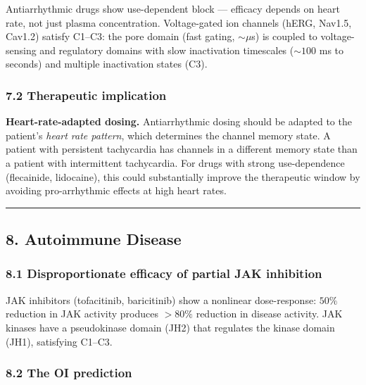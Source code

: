 \documentclass[
  11pt,
]{article}
\begin{document}
Antiarrhythmic drugs show use-dependent block --- efficacy depends on
heart rate, not just plasma concentration. Voltage-gated ion channels
(hERG, Nav1.5, Cav1.2) satisfy C1--C3: the pore domain (fast gating,
\(\sim \mu\)s) is coupled to voltage-sensing and regulatory domains with
slow inactivation timescales (\(\sim 100\) ms to seconds) and multiple
inactivation states (C3).

\hypertarget{therapeutic-implication-2}{%
\subsubsection{7.2 Therapeutic
implication}\label{therapeutic-implication-2}}

\textbf{Heart-rate-adapted dosing.} Antiarrhythmic dosing should be
adapted to the patient's \emph{heart rate pattern}, which determines the
channel memory state. A patient with persistent tachycardia has channels
in a different memory state than a patient with intermittent
tachycardia. For drugs with strong use-dependence (flecainide,
lidocaine), this could substantially improve the therapeutic window by
avoiding pro-arrhythmic effects at high heart rates.

\begin{center}\rule{0.5\linewidth}{0.5pt}\end{center}

\hypertarget{autoimmune-disease}{%
\subsection{8. Autoimmune Disease}\label{autoimmune-disease}}

\hypertarget{disproportionate-efficacy-of-partial-jak-inhibition}{%
\subsubsection{8.1 Disproportionate efficacy of partial JAK
inhibition}\label{disproportionate-efficacy-of-partial-jak-inhibition}}

JAK inhibitors (tofacitinib, baricitinib) show a nonlinear
dose-response: \(50\%\) reduction in JAK activity produces \(> 80\%\)
reduction in disease activity. JAK kinases have a pseudokinase domain
(JH2) that regulates the kinase domain (JH1), satisfying C1--C3.

\hypertarget{the-oi-prediction-3}{%
\subsubsection{8.2 The OI prediction}\label{the-oi-prediction-3}}
\end{document}
